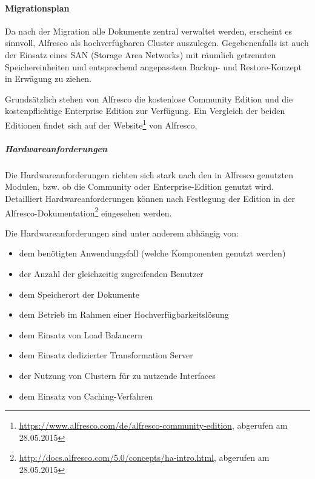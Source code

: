 \paragraph{Migrationsplan}
Da nach der Migration alle Dokumente zentral verwaltet werden, erscheint es sinnvoll, Alfresco als hochverfügbaren Cluster auszulegen. Gegebenenfalls ist auch der Einsatz eines SAN (Storage Area Networks) mit räumlich getrennten Speichereinheiten und entsprechend angepasstem Backup- und Restore-Konzept in Erwägung zu ziehen.

Grundsätzlich stehen von Alfresco die kostenlose Community Edition und die kostenpflichtige Enterprise Edition zur Verfügung. Ein Vergleich der beiden Editionen findet sich auf der Website\footnote{\url{https://www.alfresco.com/de/alfresco-community-edition}, abgerufen am 28.05.2015} von Alfresco.

\subparagraph{Hardwareanforderungen}
Die Hardwareanforderungen richten sich stark nach den in Alfresco genutzten Modulen, bzw. ob die Community oder Enterprise-Edition genutzt wird. Detailliert Hardwareanforderungen können nach Festlegung der Edition in der Alfresco-Dokumentation\footnote{\url{http://docs.alfresco.com/5.0/concepts/ha-intro.html}, abgerufen am 28.05.2015} eingesehen werden. 

Die Hardwareanforderungen sind unter anderem abhängig von:

\begin{itemize}
	\item dem benötigten Anwendungsfall (welche Komponenten genutzt werden)
	\item der Anzahl der gleichzeitig zugreifenden Benutzer
	\item dem Speicherort der Dokumente
	\item dem Betrieb im Rahmen einer Hochverfügbarkeitslösung
	\item dem Einsatz von Load Balancern
	\item dem Einsatz dedizierter Transformation Server
	\item der Nutzung von Clustern für zu nutzende Interfaces
	\item dem Einsatz von Caching-Verfahren
\end{itemize}

